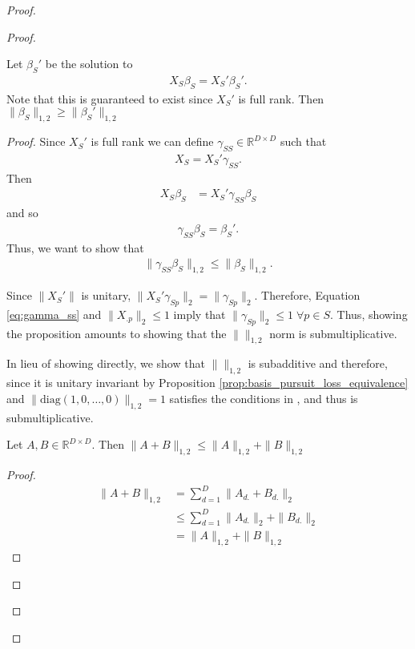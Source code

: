 \begin{proof}
\begin{proof}
\begin{proposition}
\label{prop:support_orthogonalization}
Let $\beta_S'$ be the solution to
\begin{align}
X_S \beta_S = X_S' \beta_S'.
\end{align}
Note that this is guaranteed to exist since $X_S'$ is full rank.  
Then $\|\beta_S\|_{1,2} \geq \|\beta_S'\|_{1,2}$
\end{proposition}
\begin{proof}
Since $X_S'$ is full rank we can define $\gamma_{SS} \in \mathbb R^{D \times D}$ such that 
\begin{align}
\label{eq:gamma_ss}
X_S  = X_S' \gamma_{SS}.
\end{align}
Then 
\begin{align}
X_S \beta_S &= X_S' \gamma_{SS} \beta_S
\end{align}
and so
\begin{align}
\gamma_{SS} \beta_S = \beta_S'.
\end{align}
Thus, we want to show that 
\begin{align}
\| \gamma_{SS} \beta_S  \|_{1,2} \leq \|\beta_S\|_{1,2}.
\end{align}

Since $\|X_S'\|$ is unitary, $\|X_S' \gamma_{Sp}\|_2 = \| \gamma_{Sp}\|_2$.
Therefore, Equation \ref{eq:gamma_ss} and $\|X_{.p}\|_2 \leq 1$ imply that $\|\gamma_{Sp}\|_2 \leq 1 \; \forall  p \in S$.
Thus, showing the proposition amounts to showing that the $\|\|_{1,2}$ norm is submultiplicative.

In lieu of showing directly, we show that $\|\|_{1,2}$ is subadditive and therefore, since it is unitary invariant by Proposition \ref{prop:basis_pursuit_loss_equivalence} and $\|\text{diag}(1, 0, \dotsc, 0)\|_{1,2} =1$ satisfies the conditions in \cite{HIAI2004155}, and thus is submultiplicative.

\begin{proposition}
\label{prop:subadditivity}
Let $A, B \in \mathbb R^{D \times D}$.  Then $\|A + B \|_{1,2} \leq \|A  \|_{1,2}  +  \|B \|_{1,2} $
\end{proposition}
\begin{proof}
\begin{align}
\|A + B \|_{1,2} &= \sum_{d = 1}^D \|A_{d.} + B_{d.}\|_2 \\
&\leq \sum_{d = 1}^D \|A_{d.}\|_2 + \|B_{d.}\|_2 \\
&= \|A  \|_{1,2}  +  \|B \|_{1,2} 
\end{align}
\end{proof}


\end{proof}
\end{proof}
\end{proof}
